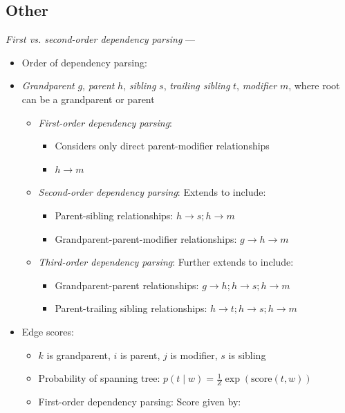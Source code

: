 \subsection*{Other}
\emph{First vs. second-order dependency parsing} ---
\begin{itemize}
    \item Order of dependency parsing:
    \item \emph{Grandparent} $g$, \emph{parent} $h$, \emph{sibling} $s$, \emph{trailing sibling} $t$, \emph{modifier} $m$, where root can be a grandparent or parent
    \begin{itemize}
        \item \emph{First-order dependency parsing}:
        \begin{itemize}
            \item Considers only direct parent-modifier relationships
            \item $h \rightarrow m$
        \end{itemize}
        \item \emph{Second-order dependency parsing}: Extends to include:
        \begin{itemize}
            \item Parent-sibling relationships: $h \rightarrow s; h \rightarrow m$
            \item Grandparent-parent-modifier relationships: $g \rightarrow h \rightarrow m$
        \end{itemize}
        \item \emph{Third-order dependency parsing}: Further extends to include:
        \begin{itemize}
            \item Grandparent-parent relationships: $g \rightarrow h; h \rightarrow s; h \rightarrow m$
            \item Parent-trailing sibling relationships: $h \rightarrow t; h \rightarrow s; h \rightarrow m$
        \end{itemize}
    \end{itemize}
    \item Edge scores:
    \begin{itemize}
        \item $k$ is grandparent, $i$ is parent, $j$ is modifier, $s$ is sibling
        \item Probability of spanning tree: $
        p(t \mid w) = \frac{1}{Z} \exp(\textrm{score}(t, w))
        $ 
        \item First-order dependency parsing: Score given by:

\end{itemize}
\end{itemize}
